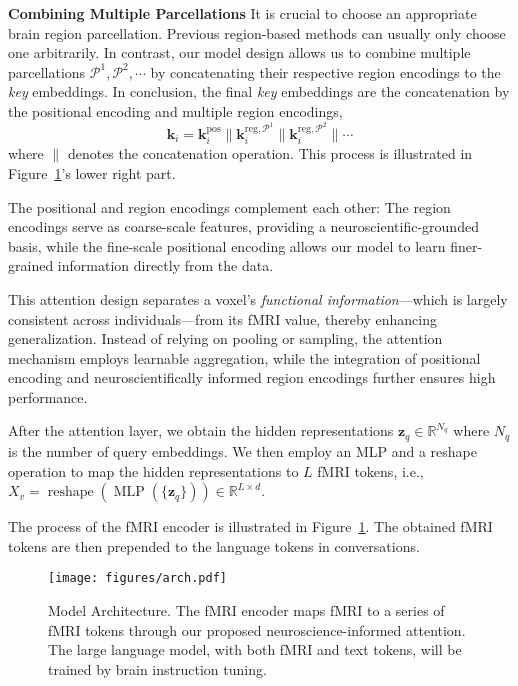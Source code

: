 \noindent\textbf{Combining Multiple Parcellations}
It is crucial to choose an appropriate brain region parcellation. Previous region-based methods \cite{qiu2023learning,li2021braingnn, kan2022brain} can usually only choose one arbitrarily. In contrast, our model design allows us to combine multiple parcellations $\mathcal{P}^1, \mathcal{P}^2, \cdots$ by concatenating their respective region encodings to the \textit{key} embeddings. In conclusion, the final \textit{key} embeddings are the concatenation by the positional encoding and multiple region encodings,
\begin{equation}
    \boldsymbol{k}_i = \boldsymbol{k}_i^\text{pos} \| \boldsymbol{k}_i^{\text{reg}, \mathcal{P}^1} \|  \boldsymbol{k}_i^{\text{reg}, \mathcal{P}^2} \| \cdots
\end{equation}
where $\|$ denotes the concatenation operation. This process is illustrated in Figure~\ref{fig:arch}'s lower right part.

The positional and region encodings complement each other: The region encodings serve as coarse-scale features, providing a neuroscientific-grounded basis, while the fine-scale positional encoding allows our model to learn finer-grained information directly from the data.

This attention design separates a voxel's \textit{functional information}—which is largely consistent across individuals—from its fMRI value, thereby enhancing generalization. Instead of relying on pooling or sampling, the attention mechanism employs learnable aggregation, while the integration of positional encoding and neuroscientifically informed region encodings further ensures high performance.

After the attention layer, we obtain the hidden representations $\boldsymbol{z}_q \in \mathbb{R}^{N_q} $ where $N_q$ is the number of query embeddings. We then employ an MLP and a reshape operation to map the hidden representations to $L$ fMRI tokens, i.e., $   X_v = \operatorname{reshape}\left( \operatorname{MLP}(
    \{\boldsymbol{z}_q\}
    ) \right) \in \mathbb{R}^{L \times d}$.

The process of the fMRI encoder is illustrated in Figure~\ref{fig:arch}. The obtained fMRI tokens are then prepended to the language tokens in conversations.
\begin{figure}
    \centering
    \texttt{[image: figures/arch.pdf]}
    \caption{Model Architecture. The fMRI encoder maps fMRI to a series of fMRI tokens through our proposed neuroscience-informed attention. The large language model, with both fMRI and text tokens, will be trained by brain instruction tuning.}
    \label{fig:arch}
    \vspace{-1em}
\end{figure}

